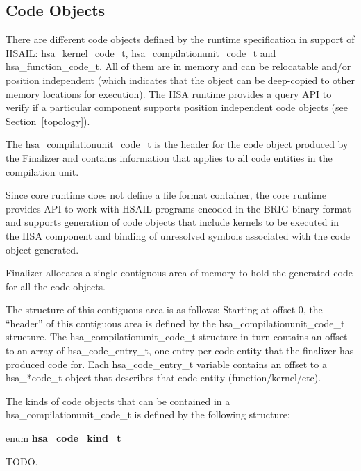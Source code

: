 \documentclass{book}
\newcommand{\hsadef}[2]{\hypertarget{#1}{\textbf{#2}}}
\newcommand{\reftyp}[1]{#1}
\begin{document}
\begin{appendices}
\subsection{Code Objects}\label{finalize:codeobject}

There are different code objects defined by the runtime specification
in support of HSAIL: \reftyp{hsa\_kernel\_code\_t},
\reftyp{hsa\_compilationunit\_code\_t} and
\reftyp{hsa\_function\_code\_t}.  All of them are in memory and can be
relocatable and/or position independent (which indicates that the
object can be deep-copied to other memory locations for
execution). The HSA runtime provides a query API to verify if a
particular component supports position independent code objects (see
Section~\ref{topology}).

The \reftyp{hsa\_compilationunit\_code\_t} is the header for the
code object produced by the Finalizer and contains information that
applies to all code entities in the compilation unit.

Since core runtime does not define a file format container, the core
runtime provides API to work with HSAIL programs encoded in the BRIG
binary format and supports generation of code objects that
include kernels to be executed in the HSA component and binding
of unresolved symbols associated with the code object
generated.

Finalizer allocates a single contiguous area of memory to hold the
generated code for all the code objects.

The structure of this contiguous area is as follows: Starting at
offset 0, the ``header'' of this contiguous area is defined by the
\reftyp{hsa\_compilationunit\_code\_t} structure. The
\reftyp{hsa\_compilationunit\_code\_t} structure in turn contains
an offset to an array of \reftyp{hsa\_code\_entry\_t}, one entry per
code entity that the finalizer has produced code for. Each
\reftyp{hsa\_code\_entry\_t} variable contains an offset to a
\reftyp{hsa\_*code\_t} object that describes that code entity
(function/kernel/etc).

The kinds of code objects that can be contained in a
\reftyp{hsa\_compilationunit\_code\_t} is defined by the following
structure:
\makeatletter{}

\noindent\begin{tcolorbox}[nobeforeafter,arc=0mm,colframe=white,colback=lightgray,left=0mm]
enum \hsadef{group__codekind_1ga085ebee59c730a7063cfe522b86f62d7}{hsa\_code\_kind\_t}
\end{tcolorbox}
TODO.


\end{appendices}
\end{document}
